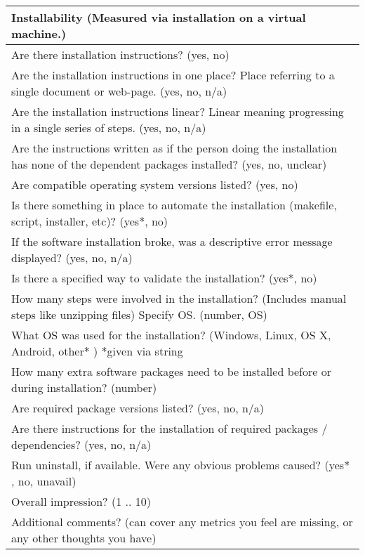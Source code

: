 \begin{table}[H]
\centering
\begin{tabular}{p{14cm}}
\hline		
\textbf{Installability  (Measured via installation on a virtual machine.) }\\
\hline
Are there installation instructions? ({yes, no})\\
Are the installation instructions in one place? Place referring to a single document or web-page. ({yes, no, n/a})\\
Are the installation instructions linear? Linear meaning progressing  in a single series of steps. ({yes, no, n/a})\\
Are the instructions written as if the person doing the installation has none of the dependent packages installed? ({yes, no, unclear})\\
Are compatible operating system versions listed? ({yes, no})\\
Is there something in place to automate the installation (makefile, script, installer, etc)? ({yes$\ast$, no})\\
If the software installation broke, was a descriptive error message displayed? ({yes, no, n/a})\\
Is there a specified way to validate the installation? ({yes$\ast$, no})\\
How many steps were involved in the installation? (Includes manual steps like unzipping files) Specify OS. (number, OS)\\
What OS was used for the installation? ({Windows, Linux, OS X, Android, other$\ast$ }) $\ast$given via string\\
How many extra software packages need to be installed before or during installation? (number)\\
Are required package versions listed? ({yes, no, n/a})\\
Are there instructions for the installation of required packages / dependencies? ({yes, no, n/a})\\
Run uninstall, if available. Were any obvious problems caused? ({yes$\ast$ , no, unavail})\\
Overall impression? ({1 .. 10})\\
Additional comments? (can cover any metrics you feel are missing, or any other thoughts you have)\\
\hline
\end{tabular}
\end{table}

